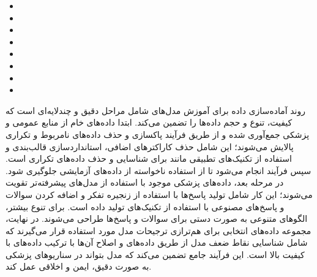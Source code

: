 \documentclass[11pt, a4paper, oneside]{book}
\begin{document}
			\begin{itemize}
				\item {}
				\item {}
				\item {}
				\item {}
				\item {}
				\item {}
				\item {}
				\item {}
			\end{itemize}
			روند آماده‌سازی داده برای آموزش مدل‌های  شامل مراحل دقیق و چندلایه‌ای است که کیفیت، تنوع و حجم داده‌ها را تضمین می‌کند. ابتدا داده‌های خام از منابع عمومی و پزشکی جمع‌آوری شده و از طریق فرآیند پاکسازی و حذف داده‌های نامربوط و تکراری پالایش می‌شوند؛ این شامل حذف کاراکترهای اضافی، استانداردسازی قالب‌بندی و استفاده از تکنیک‌های تطبیقی مانند  برای شناسایی و حذف داده‌های تکراری است. سپس فرآیند  انجام می‌شود تا از استفاده ناخواسته از داده‌های آزمایشی جلوگیری شود. در مرحله بعد، داده‌های پزشکی موجود با استفاده از مدل‌های پیشرفته‌تر تقویت می‌شوند؛ این کار شامل تولید پاسخ‌ها با استفاده از زنجیره تفکر و اضافه کردن سوالات و پاسخ‌های مصنوعی با استفاده از تکنیک‌های تولید داده است. برای تنوع بیشتر، الگوهای متنوعی به صورت دستی برای سوالات و پاسخ‌ها طراحی می‌شوند. در نهایت، مجموعه داده‌های انتخابی برای هم‌ترازی ترجیحات مدل مورد استفاده قرار می‌گیرند که شامل شناسایی نقاط ضعف مدل از طریق داده‌های  و اصلاح آن‌ها با ترکیب داده‌های با کیفیت بالا است. این فرآیند جامع تضمین می‌کند که مدل بتواند در سناریوهای پزشکی به صورت دقیق، ایمن و اخلاقی عمل کند. \cite{gururajan_aloe_2024}
			
			
\end{document}
